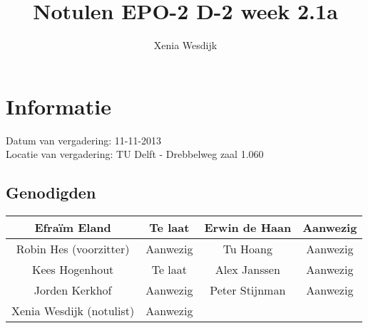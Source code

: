 \documentclass{article}
\begin{document}
\title{Notulen EPO-2 D-2 week 2.1a }%
\author{Xenia Wesdijk}%
\maketitle

\section*{Informatie}
Datum van vergadering: 11-11-2013 \\ %
Locatie van vergadering: TU Delft - Drebbelweg zaal 1.060 %
\subsection*{Genodigden}
\begin{center}
\begin{tabular}{|c |c | c| c|}
	\hline
Efraïm Eland & Te laat & Erwin de Haan & Aanwezig \\
	\hline
Robin Hes (voorzitter) & Aanwezig & Tu Hoang & Aanwezig \\
	\hline
Kees Hogenhout & Te laat & Alex Janssen & Aanwezig\\
	\hline
Jorden Kerkhof & Aanwezig & Peter Stijnman & Aanwezig \\
	\hline
Xenia Wesdijk (notulist) & Aanwezig & & \\
	\hline
\end{tabular}
\end{center}
\end{document}
